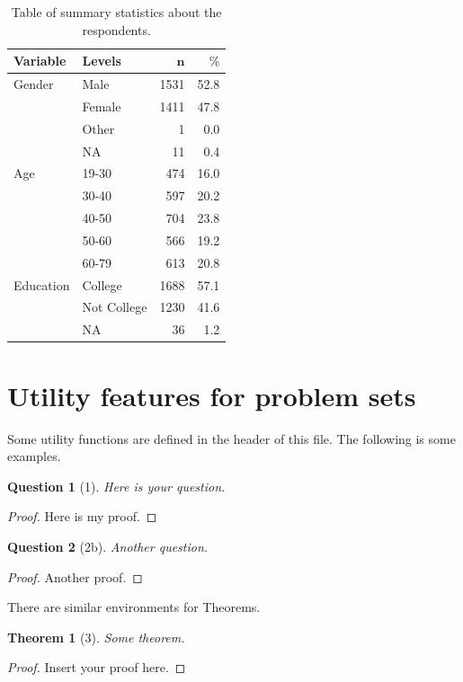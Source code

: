 \documentclass[11pt]{article}
\theoremstyle{quest}
\newtheorem*{theorem}{Theorem}
\newtheorem*{question}{Question}
\begin{document}
\begin{table}[h!] %
\centering
\begin{tabular}{ll|rr}
\hline
\hline
\textbf{Variable} & \textbf{Levels} & $\mathbf{n}$ & $\mathbf{\%}$ \\ 
\hline
Gender & Male & 1531 & 52.8 \\ 
   & Female & 1411 & 47.8 \\ 
   & Other & 1 & 0.0 \\ 
   & NA & 11 & 0.4\\
\hline
\hline
Age & 19-30 & 474 & 16.0 \\ 
   & 30-40 & 597 & 20.2 \\ 
   & 40-50 & 704 & 23.8 \\ 
   & 50-60 & 566 & 19.2 \\ 
   & 60-79 & 613 & 20.8 \\ 
\hline
\hline
Education & College & 1688 & 57.1 \\ 
   & Not College & 1230 & 41.6 \\ 
   & NA & 36 & 1.2 \\ 
\hline
\hline
\end{tabular}
\label{tab:sum}
\caption{Table of summary statistics about the respondents. 
  }
\end{table}


\newpage
\section{Utility features for problem sets}
Some utility functions are defined in the header of this file. 
The following is some examples.

\begin{question}[1]
Here is your question.
\end{question}
\begin{proof}
Here is my proof.
\end{proof}

\begin{question}[2b]
Another question.
\end{question}
\begin{proof}
Another proof.
\end{proof}

There are similar environments for Theorems.

\begin{theorem}[3]
  Some theorem.
\end{theorem}
\begin{proof}
  Insert your proof here.
\end{proof}

\end{document}
